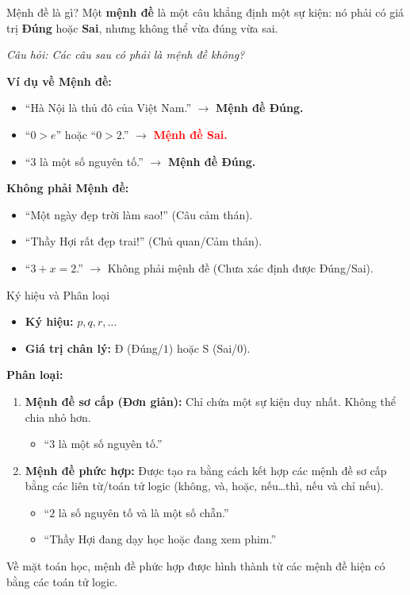 \documentclass[aspectratio=169, 11pt]{beamer}
\begin{document}
\begin{frame}{Mệnh đề là gì?}
Một \textbf{mệnh đề} là một câu khẳng định một sự kiện: nó phải có giá trị \textbf{Đúng} hoặc \textbf{Sai}, nhưng không thể vừa đúng vừa sai.

\vspace{0.2cm}
\textit{Câu hỏi: Các câu sau có phải là mệnh đề không?}

\vspace{0.2cm}
\textbf{Ví dụ về Mệnh đề:}
\begin{itemize}
  \item ``Hà Nội là thủ đô của Việt Nam.'' $\to$ \textbf{\textcolor{green!60!black}{Mệnh đề Đúng.}}
  \item ``$0 > e$'' hoặc ``$0 > 2$.'' $\to$ \textbf{\textcolor{red}{Mệnh đề Sai.}}
  \item ``$3$ là một số nguyên tố.'' $\to$ \textbf{\textcolor{green!60!black}{Mệnh đề Đúng.}}
\end{itemize}

\textbf{Không phải Mệnh đề:}
\begin{itemize}
  \item ``Một ngày đẹp trời làm sao!'' (Câu cảm thán).
  \item ``Thầy Hợi rất đẹp trai!'' (Chủ quan/Cảm thán).
  \item ``$3 + x = 2$.'' $\to$ Không phải mệnh đề (Chưa xác định được Đúng/Sai).
\end{itemize}
\end{frame}

\begin{frame}{Ký hiệu và Phân loại}
\begin{itemize}
  \item \textbf{Ký hiệu:} $p, q, r, \dots$
  \item \textbf{Giá trị chân lý:} Đ (Đúng/$1$) hoặc S (Sai/$0$).
\end{itemize}

\textbf{Phân loại:}
\begin{enumerate}
  \item \textbf{Mệnh đề sơ cấp (Đơn giản):} Chỉ chứa một sự kiện duy nhất. Không thể chia nhỏ hơn.
  \begin{itemize}
    \item ``$3$ là một số nguyên tố.''
  \end{itemize}
  \item \textbf{Mệnh đề phức hợp:} Được tạo ra bằng cách kết hợp các mệnh đề sơ cấp bằng các liên từ/toán tử logic (không, và, hoặc, nếu\dots thì, nếu và chỉ nếu).
  \begin{itemize}
    \item ``$2$ là số nguyên tố và là một số chẵn.''
    \item ``Thầy Hợi đang dạy học hoặc đang xem phim.''
  \end{itemize}
\end{enumerate}
\vspace{0.3cm}
Về mặt toán học, mệnh đề phức hợp được hình thành từ các mệnh đề hiện có bằng các toán tử logic.
\end{frame}
\end{document}
